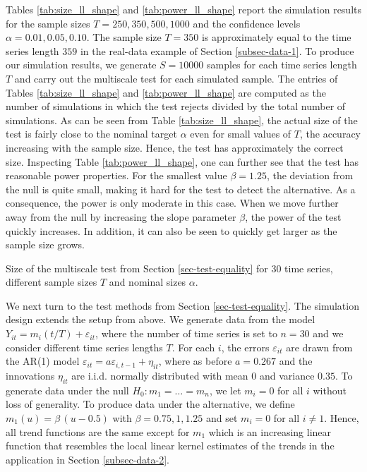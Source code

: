 Tables \ref{tab:size_ll_shape} and \ref{tab:power_ll_shape} report the simulation results for the sample sizes $T=250,350,500, 1000$ and the confidence levels $\alpha = 0.01, 0.05, 0.10$. The sample size $T = 350$ is approximately equal to the time series length $359$ in the real-data example of Section \ref{subsec-data-1}. To produce our simulation results, we generate $S=10000$ samples for each time series length $T$ and carry out the multiscale test for each simulated sample. The entries of Tables \ref{tab:size_ll_shape} and \ref{tab:power_ll_shape} are computed as the number of simulations in which the test rejects divided by the total number of simulations. As can be seen from Table \ref{tab:size_ll_shape}, the actual size of the test is fairly close to the nominal target $\alpha$ even for small values of $T$, the accuracy increasing with the sample size. Hence, the test has approximately the correct size. Inspecting Table \ref{tab:power_ll_shape}, one can further see that the test has reasonable power properties. For the smallest value $\beta = 1.25$, the deviation from the null is quite small, making it hard for the test to detect the alternative. As a consequence, the power is only moderate in this case. When we move further away from the null by increasing the slope parameter $\beta$, the power of the test quickly increases. In addition, it can also be seen to quickly get larger as the sample size grows. 
 



\begin{table}[t]
\footnotesize{
\begin{center}
\caption{Size of the multiscale test from Section \ref{sec-test-equality} for 30 time series, different sample sizes $T$ and nominal sizes $\alpha$.}
\label{tab:size_ll_equality}
\renewcommand{\arraystretch}{1.2}

\end{center}}
\end{table}


We next turn to the test methods from Section \ref{sec-test-equality}. The simulation design extends the setup from above. We generate data from the model $Y_{it} = m_i(t/T) + \varepsilon_{it}$, where the number of time series is set to $n = 30$ and we consider different time series lengths $T$. For each $i$, the errors $\varepsilon_{it}$ are drawn from the AR(1) model $\varepsilon_{it} = a \varepsilon_{i,t-1} + \eta_{it}$, where as before $a = 0.267$ and the innovations $\eta_{it}$ are i.i.d. normally distributed with mean $0$ and variance $0.35$. To generate data under the null $H_0: m_1 = \ldots = m_n$, we let $m_i = 0$ for all $i$ without loss of generality. To produce data under the alternative, we define $m_1(u) = \beta \, (u - 0.5) $ with $\beta = 0.75, 1, 1.25$ and set $m_i = 0$ for all $i \ne 1$. Hence, all trend functions are the same except for $m_1$ which is an increasing linear function that resembles the local linear kernel estimates of the trends in the application in Section \ref{subsec-data-2}. 


